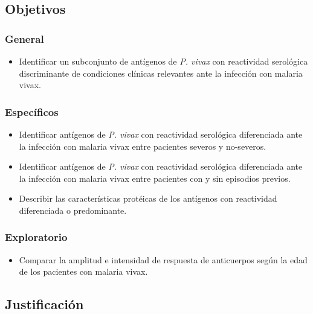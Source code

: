 \documentclass[]{article}
\providecommand{\tightlist}{%
  \setlength{\itemsep}{0pt}\setlength{\parskip}{0pt}}
\begin{document}
\subsection{Objetivos}\label{objetivos}

\subsubsection{General}\label{general}

\begin{itemize}
\tightlist
\item
  Identificar un subconjunto de antígenos de \emph{P. vivax} con
  reactividad serológica discriminante de condiciones clínicas
  relevantes ante la infección con malaria vivax.
\end{itemize}

\subsubsection{Específicos}\label{especificos}

\begin{itemize}
\item
  Identificar antígenos de \emph{P. vivax} con reactividad serológica
  diferenciada ante la infección con malaria vivax entre pacientes
  severos y no-severos.
\item
  Identificar antígenos de \emph{P. vivax} con reactividad serológica
  diferenciada ante la infección con malaria vivax entre pacientes con y
  sin episodios previos.
\item
  Describir las características protéicas de los antígenos con
  reactividad diferenciada o predominante.
\end{itemize}

\subsubsection{Exploratorio}\label{exploratorio}

\begin{itemize}
\tightlist
\item
  Comparar la amplitud e intensidad de respuesta de anticuerpos según la
  edad de los pacientes con malaria vivax.
\end{itemize}

\subsection{Justificación}\label{justif}
\end{document}

